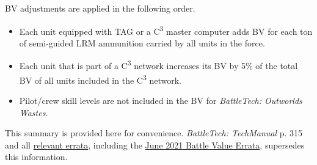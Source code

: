 BV adjustments are applied in the following order.

\begin{itemize}

\item Each unit equipped with TAG or a C\textsuperscript{3} master computer adds BV for each ton of semi-guided LRM ammunition carried by all units in the force.

\item Each unit that is part of a C\textsuperscript{3} network increases its BV by 5\% of the total BV of all units included in the C\textsuperscript{3} network.

\item Pilot/crew skill levels are not included in the BV for \emph{BattleTech: Outworlds Wastes}.

\end{itemize}

This summary is provided here for convenience.
\emph{BattleTech: TechManual} p. 315 and all \href{https://bg.battletech.com/errata}{relevant errata}, including the \href{https://bg.battletech.com/wp-content/uploads/2021/06/TechManual-TM_BV4.1-Rev2021.pdf}{June 2021 Battle Value Errata}, supersedes this information.
